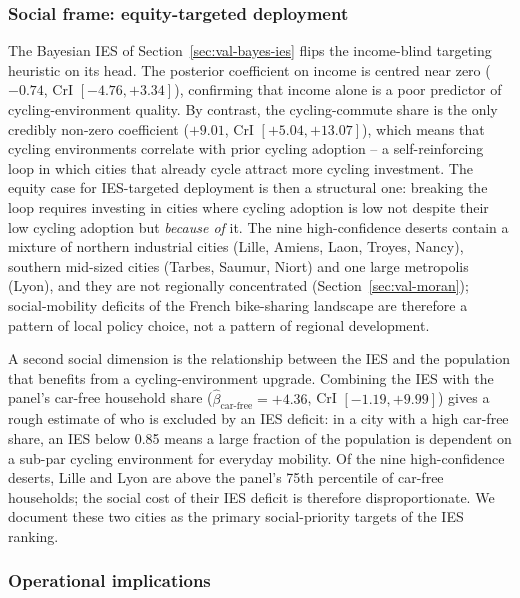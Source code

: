 \documentclass[11pt,a4paper]{article}
\begin{document}
\subsubsection*{Social frame: equity-targeted deployment}

The Bayesian IES of Section~\ref{sec:val-bayes-ies} flips the
income-blind targeting heuristic on its head. The posterior
coefficient on income is centred near zero ($-0.74$, CrI
$[-4.76, +3.34]$), confirming that income alone is a poor
predictor of cycling-environment quality. By contrast, the
cycling-commute share is the only credibly non-zero coefficient
($+9.01$, CrI $[+5.04, +13.07]$), which means that cycling
environments correlate with prior cycling adoption -- a
self-reinforcing loop in which cities that already cycle attract
more cycling investment. The equity case for IES-targeted
deployment is then a structural one: breaking the loop requires
investing in cities where cycling adoption is low not despite
their low cycling adoption but \emph{because of} it. The nine
high-confidence deserts contain a mixture of northern industrial
cities (Lille, Amiens, Laon, Troyes, Nancy), southern mid-sized
cities (Tarbes, Saumur, Niort) and one large metropolis (Lyon),
and they are not regionally concentrated
(Section~\ref{sec:val-moran}); social-mobility deficits of the
French bike-sharing landscape are therefore a pattern of local
policy choice, not a pattern of regional development.

A second social dimension is the relationship between the IES
and the population that benefits from a cycling-environment
upgrade. Combining the IES with the panel's car-free household
share ($\hat\beta_{\text{car-free}} = +4.36$, CrI $[-1.19,
+9.99]$) gives a rough estimate of who is excluded by an IES
deficit: in a city with a high car-free share, an IES below 0.85
means a large fraction of the population is dependent on a
sub-par cycling environment for everyday mobility. Of the nine
high-confidence deserts, Lille and Lyon are above the panel's
75th percentile of car-free households; the social cost of their
IES deficit is therefore disproportionate. We document these
two cities as the primary social-priority targets of the IES
ranking.

\subsubsection*{Operational implications}
\end{document}
